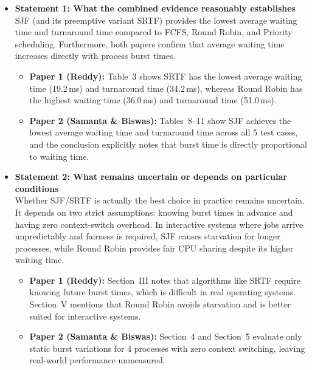 \documentclass[11pt]{article}
\begin{document}
\begin{itemize}
    \item \textbf{Statement 1: What the combined evidence reasonably establishes} \\
    SJF (and its preemptive variant SRTF) provides the lowest average waiting time and turnaround time compared to FCFS, Round Robin, and Priority scheduling. Furthermore, both papers confirm that average waiting time increases directly with process burst times.
    \begin{itemize}
        \item \textbf{Paper 1 (Reddy):} Table~3 shows SRTF has the lowest average waiting time (19.2\,ms) and turnaround time (34.2\,ms), whereas Round Robin has the highest waiting time (36.0\,ms) and turnaround time (51.0\,ms).
        \item \textbf{Paper 2 (Samanta \& Biswas):} Tables~8--11 show SJF achieves the lowest average waiting time and turnaround time across all 5 test cases, and the conclusion explicitly notes that burst time is directly proportional to waiting time.
    \end{itemize}

    \vspace{0.8em}
    \item \textbf{Statement 2: What remains uncertain or depends on particular conditions} \\
    Whether SJF/SRTF is actually the best choice in practice remains uncertain. It depends on two strict assumptions: knowing burst times in advance and having zero context-switch overhead. In interactive systems where jobs arrive unpredictably and fairness is required, SJF causes starvation for longer processes, while Round Robin provides fair CPU sharing despite its higher waiting time.
    \begin{itemize}
        \item \textbf{Paper 1 (Reddy):} Section~III notes that algorithms like SRTF require knowing future burst times, which is difficult in real operating systems. Section~V mentions that Round Robin avoids starvation and is better suited for interactive systems.
        \item \textbf{Paper 2 (Samanta \& Biswas):} Section~4 and Section~5 evaluate only static burst variations for 4 processes with zero context switching, leaving real-world performance unmeasured.
    \end{itemize}


\end{itemize}
\end{document}
